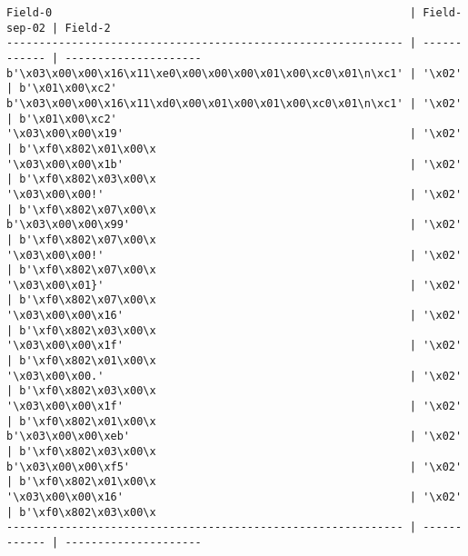 \begin{verbatim}
Field-0                                                       | Field-sep-02 | Field-2
------------------------------------------------------------- | ------------ | ---------------------
b'\x03\x00\x00\x16\x11\xe0\x00\x00\x00\x01\x00\xc0\x01\n\xc1' | '\x02'       | b'\x01\x00\xc2'
b'\x03\x00\x00\x16\x11\xd0\x00\x01\x00\x01\x00\xc0\x01\n\xc1' | '\x02'       | b'\x01\x00\xc2'
'\x03\x00\x00\x19'                                            | '\x02'       | b'\xf0\x802\x01\x00\x
'\x03\x00\x00\x1b'                                            | '\x02'       | b'\xf0\x802\x03\x00\x
'\x03\x00\x00!'                                               | '\x02'       | b'\xf0\x802\x07\x00\x
b'\x03\x00\x00\x99'                                           | '\x02'       | b'\xf0\x802\x07\x00\x
'\x03\x00\x00!'                                               | '\x02'       | b'\xf0\x802\x07\x00\x
'\x03\x00\x01}'                                               | '\x02'       | b'\xf0\x802\x07\x00\x
'\x03\x00\x00\x16'                                            | '\x02'       | b'\xf0\x802\x03\x00\x
'\x03\x00\x00\x1f'                                            | '\x02'       | b'\xf0\x802\x01\x00\x
'\x03\x00\x00.'                                               | '\x02'       | b'\xf0\x802\x03\x00\x
'\x03\x00\x00\x1f'                                            | '\x02'       | b'\xf0\x802\x01\x00\x
b'\x03\x00\x00\xeb'                                           | '\x02'       | b'\xf0\x802\x03\x00\x
b'\x03\x00\x00\xf5'                                           | '\x02'       | b'\xf0\x802\x01\x00\x
'\x03\x00\x00\x16'                                            | '\x02'       | b'\xf0\x802\x03\x00\x
------------------------------------------------------------- | ------------ | ---------------------
\end{verbatim}
